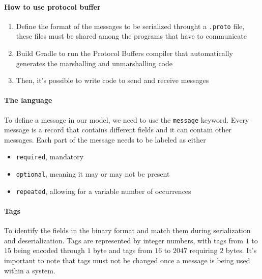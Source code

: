 \paragraph{How to use protocol buffer}
\begin{enumerate}
    \item Define the format of the messages to be serialized throught a \texttt{.proto} file, these files must be shared among the programs that have to communicate
    \item Build Gradle to run the Protocol Buffers compiler that automatically generates the marshalling and unmarshalling code
    \item Then, it’s possible to write code to send and receive messages
\end{enumerate}

\paragraph{The language}
To define a message in our model, we need to use the \texttt{message} keyword. Every message is a record that contains different fields and it can contain other messages. Each part of the message needs to be labeled as either 
\begin{itemize}
    \item \texttt{required}, mandatory
    \item \texttt{optional}, meaning it may or may not be present
    \item \texttt{repeated}, allowing for a variable number of occurrences
\end{itemize}

\paragraph{Tags}
To identify the fields in the binary format and match them during serialization and deserialization. Tags are represented by integer numbers, with tags from $1$ to $15$ being encoded through $1$ byte and tags from $16$ to $2047$ requiring $2$ bytes. It's important to note that tags must not be changed once a message is being used within a system.

